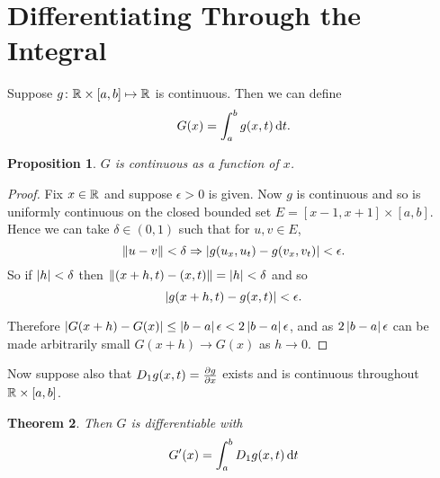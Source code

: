 \documentclass{notes}
\theoremstyle{plain}
\newtheorem{proposition}{Proposition}[chapter]
\newtheorem{theorem}[proposition]{Theorem}
\begin{document}
\section{Differentiating Through the Integral}
Suppose $ g\colon \mathbb{R} \times [a,b] \mapsto \mathbb{R} $ is continuous. Then we 
can define
\[
G(x)=\int_{a}^{b}g(x,t)\,\mathrm{d} t.
\]

\begin{proposition}
$ G $ is continuous as a function of $ x $.
\end{proposition}

\begin{proof}
Fix $ x \in \mathbb{R} $ and suppose $ \epsilon>0  $ is given.
Now $ g $ is continuous and so is uniformly continuous on the closed 
bounded set $E = [x-1,x+1] \times [a,b]$.
Hence we can take $\delta \in (0,1)$ such that for $ u,v \in E $,
\[
\left\|u-v\right\|<\delta \Rightarrow \left|g(u_x,u_t)-g(v_x,v_t)\right| < \epsilon.
\]
So if $ \left|h\right| < \delta $ then $\left\|(x+h,t)-(x,t)\right\| = \left|h\right| < \delta$
and so
\[
\left|g(x+h,t)-g(x,t)\right|< \epsilon.
\]

Therefore $\left|G(x+h)-G(x)\right| \leq \left|b-a\right|\epsilon < 2 \left|b-a\right| \epsilon$,
and as $ 2\left|b-a\right|\epsilon $ can be made arbitrarily small
$G(x+h)\to G(x)$ as $ h \to 0 $.
\end{proof}

Now suppose also that
$D_{1}g(x,t) = \frac{\partial g}{\partial x}$
exists and is continuous throughout $ \mathbb{R} \times [a,b] $.

\begin{theorem}
Then $ G $ is differentiable with
\[ G'(x) = \int_{a}^{b}D_{1}g(x,t)\,\mathrm{d} t \]
\end{theorem}
\end{document}
